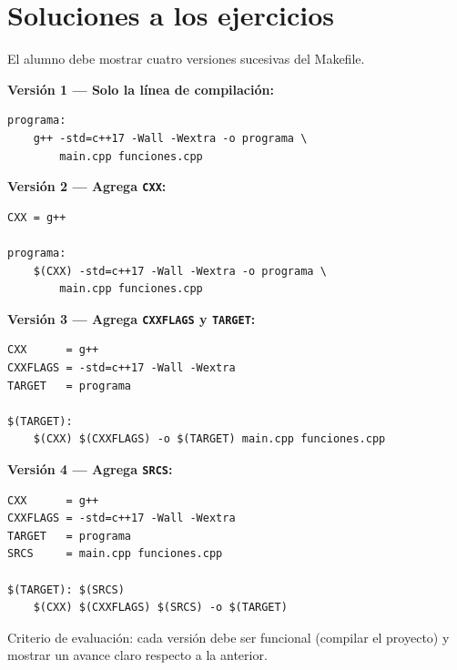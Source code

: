 \documentclass[12pt, oneside]{article}
\begin{document}
\section{Soluciones a los ejercicios}

\begin{notaprofesor}
  El alumno debe mostrar cuatro versiones sucesivas del Makefile.

  \textbf{Versión 1 — Solo la línea de compilación:}
\begin{verbatim}
programa:
	g++ -std=c++17 -Wall -Wextra -o programa \
	    main.cpp funciones.cpp
\end{verbatim}

  \textbf{Versión 2 — Agrega \texttt{CXX}:}
\begin{verbatim}
CXX = g++

programa:
	$(CXX) -std=c++17 -Wall -Wextra -o programa \
	    main.cpp funciones.cpp
\end{verbatim}

  \textbf{Versión 3 — Agrega \texttt{CXXFLAGS} y \texttt{TARGET}:}
\begin{verbatim}
CXX      = g++
CXXFLAGS = -std=c++17 -Wall -Wextra
TARGET   = programa

$(TARGET):
	$(CXX) $(CXXFLAGS) -o $(TARGET) main.cpp funciones.cpp
\end{verbatim}

  \textbf{Versión 4 — Agrega \texttt{SRCS}:}
\begin{verbatim}
CXX      = g++
CXXFLAGS = -std=c++17 -Wall -Wextra
TARGET   = programa
SRCS     = main.cpp funciones.cpp

$(TARGET): $(SRCS)
	$(CXX) $(CXXFLAGS) $(SRCS) -o $(TARGET)
\end{verbatim}

  Criterio de evaluación: cada versión debe ser funcional (compilar el
  proyecto) y mostrar un avance claro respecto a la anterior.
\end{notaprofesor}
\end{document}
